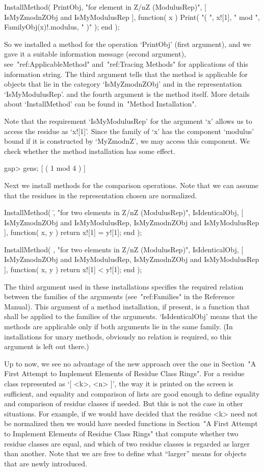 \begintt
InstallMethod( PrintObj,
"for element in Z/nZ (ModulusRep)",
[ IsMyZmodnZObj and IsMyModulusRep ],
function( x )
Print( "( ", x![1], " mod ", FamilyObj(x)!.modulus, " )" );
end );
\endtt

So we installed a method for the operation `PrintObj' (first argument),
and we gave it a suitable information message (second argument),
see~"ref:ApplicableMethod" and~"ref:Tracing Methods" for applications of
this information string.
The third argument tells {\GAP} that the method is applicable for
objects that lie in the category `IsMyZmodnZObj' and in the representation
`IsMyModulusRep'.
and the fourth argument is the method itself.
More details about `InstallMethod' can be found in~"Method Installation".

Note that the requirement `IsMyModulusRep' for the argument `x' allows us
to access the residue as `x![1]'.
Since the family of `x' has the component `modulus' bound if it is
constructed by `MyZmodnZ', we may access this component.
We check whether the method installation has some effect.

\begintt
gap> gens;
[ ( 1 mod 4 ) ]
\endtt

Next we install methods for the comparison operations.
Note that we can assume that the residues in the representation chosen
are normalized.

\begintt
InstallMethod( \=,
    "for two elements in Z/nZ (ModulusRep)",
    IsIdenticalObj,
    [ IsMyZmodnZObj and IsMyModulusRep, IsMyZmodnZObj and IsMyModulusRep ],
    function( x, y ) return x![1] = y![1]; end );

InstallMethod( \<,
    "for two elements in Z/nZ (ModulusRep)",
    IsIdenticalObj,
    [ IsMyZmodnZObj and IsMyModulusRep, IsMyZmodnZObj and IsMyModulusRep ],
    function( x, y ) return x![1] < y![1]; end );
\endtt

The third argument used in these installations specifies the required
relation between the families of the arguments
(see~"ref:Families" in the Reference Manual).
This argument of a method installation, if present, is a function that shall
be applied to the families of the arguments.
`IsIdenticalObj' means that the methods are applicable only if both arguments
lie in the same family.
(In installations for unary methods, obviously no relation is required,
so this argument is left out there.)

Up to now, we see no advantage of the new approach over the one in
Section~"A First Attempt to Implement Elements of Residue Class Rings".
For a residue class represented as `[ <k>, <n> ]', the way it is printed
on the screen is sufficient, and equality and comparison of lists are
good enough to define equality and comparison of residue classes if needed.
But this is not the case in other situations.
For example, if we would have decided that the residue <k> need not be
normalized then we would have needed functions in
Section~"A First Attempt to Implement Elements of Residue Class Rings"
that compute whether two residue classes are equal, and which of two
residue classes is regarded as larger than another.
Note that we are free to define what ``larger'' means for objects that
are newly introduced.

